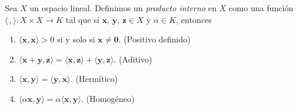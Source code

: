 \begin{definicion}{}{}
    Sea $X$ un espacio lineal. Definimos un \emph{producto interno} en $X$ como una función $\langle \, , \rangle : X \times X \longrightarrow K$ tal que si $\mathbf{x}$, $\mathbf{y}$, $\mathbf{z} \in X$ y $\alpha \in K$, entonces
    \begin{enumerate}[label=\roman*), topsep=6pt, itemsep=0pt]
        \item $\langle \mathbf{x}, \mathbf{x} \rangle > 0$ si y solo si $\mathbf{x} \neq \mathbf{0}$. \hfill (Positivo definido)
        \item $\langle \mathbf{x} + \mathbf{y}, \mathbf{z} \rangle = \langle \mathbf{x}, \mathbf{z} \rangle + \langle \mathbf{y}, \mathbf{z} \rangle$. \hfill (Aditivo)
        \item $\langle \mathbf{x}, \mathbf{y} \rangle = \overline{\langle \mathbf{y}, \mathbf{x} \rangle}$. \hfill (Hermítico)
        \item $\langle \alpha \mathbf{x}, \mathbf{y} \rangle = \alpha \langle \mathbf{x}, \mathbf{y} \rangle$. \hfill (Homogéneo)
    \end{enumerate}
\end{definicion}


